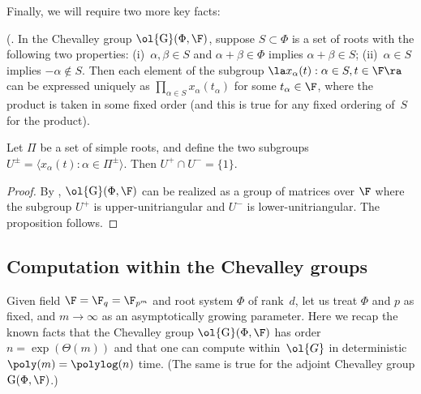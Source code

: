 \documentclass[11pt]{article}
\newcommand{\rnote}[1]{}
\newcommand{\Esc}[2]{\ol{\mathrm{G}}(#1,#2)}
\newcommand{\Gu}[2]{\ol{\mathrm{G}}(#1,#2)}
\newcommand{\Gad}[2]{\mathrm{G}(#1,#2)}
\newcommand{\G}[2]{\mathrm{G}(#1,#2)}
\begin{document}





Finally, we will require two more key facts:
\begin{proposition} \label{prop:steinberg17}
    \textnormal{(\cite[Lem.~17]{Ste16}.}
    In the Chevalley group $\Esc{\Phi}{\F}$, suppose $S \subset \Phi$ is a set of roots with the following two properties: (i)~$\alpha, \beta \in S$ and $\alpha + \beta \in \Phi$ implies $\alpha + \beta \in S$; (ii)~$\alpha \in S$ implies $-\alpha \not \in S$.
    Then each element of the subgroup $\la x_\alpha(t) : \alpha \in S, t \in \F \ra$ can be expressed uniquely as $\prod_{\alpha \in S} x_\alpha(t_\alpha)$ for some $t_\alpha \in \F$, where the product is taken in some fixed order (and this is true for any fixed ordering of~$S$ for the product).
\end{proposition}
\begin{proposition}\label{prop:uniint}
Let $\Pi$ be a set of simple roots, and define the two subgroups $U^\pm = \langle x_{\alpha}(t) : \alpha \in \Pi^\pm \rangle$. Then $U^+ \cap U^- = \{1\}$.
\end{proposition}
\begin{proof}
By \cite[Lem.~18, Cor.~3]{Ste16}, $\Esc{\Phi}{\F}$ can be realized as a group of matrices over $\F$ where the subgroup $U^+$ is upper-unitriangular and $U^{-}$ is lower-unitriangular. The proposition follows.
\end{proof}

\subsection{Computation within the Chevalley groups}    \label{sec:computation}
Given field $\F = \F_q = \F_{p^m}$ and root system $\Phi$ of rank~$d$, let us treat $\Phi$ and $p$ as fixed, and $m \to \infty$ as an asymptotically growing parameter.
Here we recap the known facts that the Chevalley group $\Gu{\Phi}{\F}$ has order $n = \exp(\Theta(m))$ and that one can compute within~$\ol{G}$ in deterministic $\poly(m) = \polylog(n)$ time.
(The same is true for the adjoint Chevalley group $\Gad{\Phi}{\F}$.)\\
\end{document}
